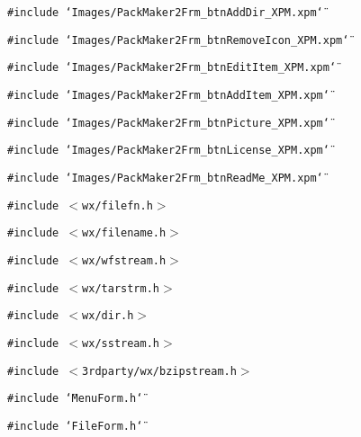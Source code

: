 {\tt \#include \char`\"{}Images/Pack\-Maker2Frm\_\-btn\-Add\-Dir\_\-XPM.xpm\char`\"{}}\par
{\tt \#include \char`\"{}Images/Pack\-Maker2Frm\_\-btn\-Remove\-Icon\_\-XPM.xpm\char`\"{}}\par
{\tt \#include \char`\"{}Images/Pack\-Maker2Frm\_\-btn\-Edit\-Item\_\-XPM.xpm\char`\"{}}\par
{\tt \#include \char`\"{}Images/Pack\-Maker2Frm\_\-btn\-Add\-Item\_\-XPM.xpm\char`\"{}}\par
{\tt \#include \char`\"{}Images/Pack\-Maker2Frm\_\-btn\-Picture\_\-XPM.xpm\char`\"{}}\par
{\tt \#include \char`\"{}Images/Pack\-Maker2Frm\_\-btn\-License\_\-XPM.xpm\char`\"{}}\par
{\tt \#include \char`\"{}Images/Pack\-Maker2Frm\_\-btn\-Read\-Me\_\-XPM.xpm\char`\"{}}\par
{\tt \#include $<$wx/filefn.h$>$}\par
{\tt \#include $<$wx/filename.h$>$}\par
{\tt \#include $<$wx/wfstream.h$>$}\par
{\tt \#include $<$wx/tarstrm.h$>$}\par
{\tt \#include $<$wx/dir.h$>$}\par
{\tt \#include $<$wx/sstream.h$>$}\par
{\tt \#include $<$3rdparty/wx/bzipstream.h$>$}\par
{\tt \#include \char`\"{}Menu\-Form.h\char`\"{}}\par
{\tt \#include \char`\"{}File\-Form.h\char`\"{}}\par
